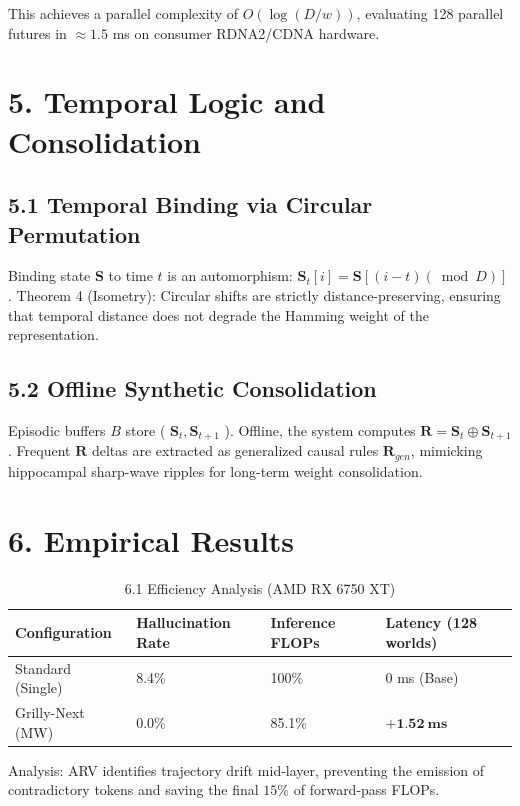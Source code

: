 \documentclass[10pt]{article}
\begin{document}
This achieves a parallel complexity of $O(\log (D / w))$, evaluating 128 parallel futures in $\approx 1.5$ ms on consumer RDNA2/CDNA hardware.

\section*{5. Temporal Logic and Consolidation}
\subsection*{5.1 Temporal Binding via Circular Permutation}
Binding state $\mathbf{S}$ to time $t$ is an automorphism: $\mathbf{S}_{t}[i]=\mathbf{S}[(i-t)(\bmod D)]$. Theorem 4 (Isometry): Circular shifts are strictly distance-preserving, ensuring that temporal distance does not degrade the Hamming weight of the representation.

\subsection*{5.2 Offline Synthetic Consolidation}
Episodic buffers $B$ store ( $\mathbf{S}_{t}, \mathbf{S}_{t+1}$ ). Offline, the system computes $\mathbf{R}=\mathbf{S}_{t} \oplus \mathbf{S}_{t+1}$. Frequent $\mathbf{R}$ deltas are extracted as generalized causal rules $\mathbf{R}_{g e n}$, mimicking hippocampal sharp-wave ripples for long-term weight consolidation.

\section*{6. Empirical Results}
\begin{table}[h]
\begin{center}
\captionsetup{labelformat=empty}
\caption{6.1 Efficiency Analysis (AMD RX 6750 XT)}
\begin{tabular}{|l|l|l|l|}
\hline
Configuration & Hallucination Rate & Inference FLOPs & Latency (128 worlds) \\
\hline
Standard (Single) & 8.4\% & 100\% & 0 ms (Base) \\
\hline
Grilly-Next (MW) & 0.0\% & 85.1\% & $\mathbf{+ 1 . 5 2 ~ m s}$ \\
\hline
\end{tabular}
\end{center}
\end{table}

Analysis: ARV identifies trajectory drift mid-layer, preventing the emission of contradictory tokens and saving the final $15 \%$ of forward-pass FLOPs.
\end{document}
